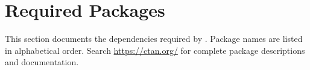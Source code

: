 \documentclass[12pt]{tlc-article}
\begin{document}

\clearpage
\section{Required Packages}
This section documents the dependencies required by \tlcA. Package names are
listed in alphabetical order. Search \url{https://ctan.org/} for complete
package descriptions and documentation.

\csvreader[tlcPkgStyle, separator=pipe]{\tlcPkgFile}{}{\name & \description}

\end{document}
